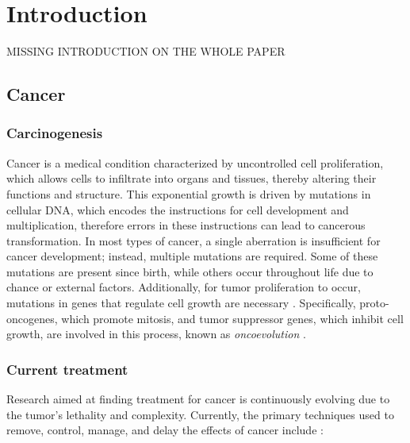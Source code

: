 \chapter{Introduction} \label{chap:introduction}

MISSING INTRODUCTION ON THE WHOLE PAPER 

\section{Cancer}

\subsection{Carcinogenesis}

Cancer is a medical condition characterized by uncontrolled cell proliferation, which allows cells to infiltrate into organs and tissues, thereby altering their functions and structure. This exponential growth is driven by mutations in cellular DNA, which encodes the instructions for cell development and multiplication, therefore errors in these instructions can lead to cancerous transformation. In most types of cancer, a single aberration is insufficient for cancer development; instead, multiple mutations are required. Some of these mutations are present since birth, while others occur throughout life due to chance or external factors. Additionally, for tumor proliferation to occur, mutations in genes that regulate cell growth are necessary \cite{Vogelstein2004}. Specifically, proto-oncogenes, which promote mitosis, and tumor suppressor genes, which inhibit cell growth, are involved in this process, known as \textit{oncoevolution} \cite{carcinogenesis}. 

\subsection{Current treatment}

Research aimed at finding treatment for cancer is continuously evolving due to the tumor's lethality and complexity. Currently, the primary techniques used to remove, control, manage, and delay the effects of cancer include \cite{cancer_treat}:

